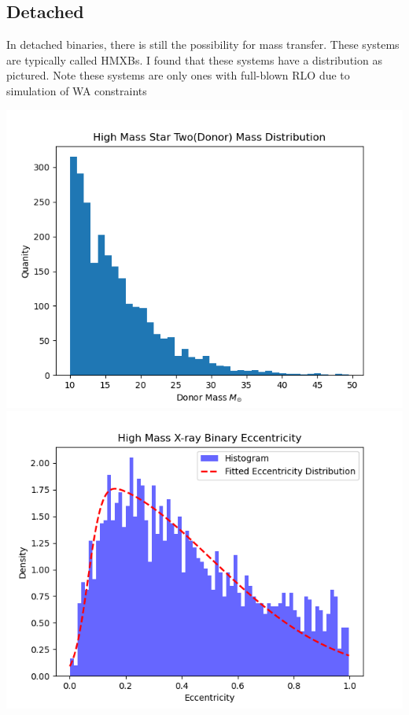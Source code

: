 \documentclass[12pt, letterpaper]{article}
\begin{document}
        \subsection{\centering Detached}
        In detached binaries, there is still the possibility for mass transfer. These systems are typically called HMXBs. I found that these systems have a distribution as pictured. Note these systems are only ones with full-blown RLO due to simulation of WA constraints
        \begin{center}
            \includegraphics[scale = .6]{Figs/High Max X-ray Binary Star Two Mass Distro.png}
            \includegraphics[scale =.6]{Figs/High Mass X-ray Binary Eccentricity.png}
        \end{center}
\end{document}
